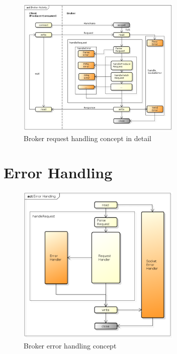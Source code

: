 \begin{figure}[H]
    \centering
    \includegraphics[width=0.7\textwidth]{images/broker-activity-detail.png}
    \caption{Broker request handling concept in detail}
    \label{fig:broker-activity-detail.png}
\end{figure}


\section{Error Handling}

\begin{figure}[H]
    \centering
    \includegraphics[width=0.7\textwidth]{images/broker-error-activity.png}
    \caption{Broker error handling concept}
    \label{fig:broker-error-activity.png}
\end{figure}


